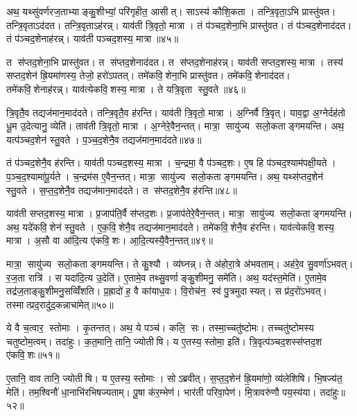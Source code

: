 अथ॒ यथ्सु॑वर्णरज॒ताभ्याङ्कु॒शीभ्यां॒ परि॑गृहीत॒ आसीत्। साऽस्य॑ कौशि॒कता। तन्त्रि॒वृता॒ऽभि प्रास्तु॑वत। तन्त्रि॒वृताऽद॑दत। तन्त्रि॒वृताऽह॑रन्न्। याव॑ती त्रि॒वृतो॒ मात्रा। तं प॑ञ्चद॒शेना॒भि प्रास्तु॑वत। तं प॑ञ्चद॒शेनाद॑दत। तं प॑ञ्चद॒शेनाह॑रन्न्। याव॑ती पञ्चद॒शस्य॒ मात्रा॥४५॥

त स॑प्तद॒शेना॒भि प्रास्तु॑वत। त स॑प्तद॒शेनाद॑दत। त स॑प्तद॒शेनाह॑रन्न्। याव॑ती सप्तद॒शस्य॒ मात्रा। तस्य॑ सप्तद॒शेन॑ ह्रि॒यमा॑णस्य॒ तेजो॒ हरो॑ऽपतत्। तमे॑कवि॒शेना॒भि प्रास्तु॑वत। तमे॑कवि॒शेनाद॑दत। तमे॑कवि॒शेनाह॑रन्न्। याव॑त्येकवि॒शस्य॒ मात्रा। ते यत्रि॒वृता स्तु॒वते॥४६॥

त्रि॒वृतै॒व तद्यज॑मान॒माद॑दते। तन्त्रि॒वृतै॒व ह॑रन्ति। याव॑ती त्रि॒वृतो॒ मात्रा। अ॒ग्निर्वै त्रि॒वृत्। याव॒द्वा अ॒ग्नेर्दह॑तो धू॒म उ॒देत्यानु॒ व्येति॑। ताव॑ती त्रि॒वृतो॒ मात्रा। अ॒ग्नेरे॒वैन॒न्तत्। मात्रा॒ सायु॑ज्य सलो॒कताङ्गमयन्ति। अथ॒ यत्प॑ञ्चद॒शेन॑ स्तु॒वते। प॒ञ्च॒द॒शेनै॒व तद्यज॑मान॒माद॑दते॥४७॥

तं प॑ञ्चद॒शेनै॒व ह॑रन्ति। याव॑ती पञ्चद॒शस्य॒ मात्रा। च॒न्द्रमा॒ वै प॑ञ्चद॒शः। ए॒ष हि प॑ञ्चद॒श्याम॑पक्षी॒यते। प॒ञ्च॒द॒श्यामा॑पू॒र्यते। च॒न्द्रम॑स ए॒वैन॒न्तत्। मात्रा॒ सायु॑ज्य सलो॒कताङ्गमयन्ति। अथ॒ यथ्स॑प्तद॒शेन॑ स्तु॒वते। स॒प्त॒द॒शेनै॒व तद्यज॑मान॒माद॑दते। त स॑प्तद॒शेनै॒व ह॑रन्ति॥४८॥

याव॑ती सप्तद॒शस्य॒ मात्रा। प्र॒जाप॑ति॒र्वै स॑प्तद॒शः। प्र॒जाप॑तेरे॒वैन॒न्तत्। मात्रा॒ सायु॑ज्य सलो॒कताङ्गमयन्ति। अथ॒ यदे॑कवि॒शेन॑ स्तु॒वते। ए॒क॒वि॒शेनै॒व तद्यज॑मान॒माद॑दते। तमे॑कवि॒शेनै॒व ह॑रन्ति। याव॑त्येकवि॒शस्य॒ मात्रा। अ॒सौ वा आ॑दि॒त्य ए॑कवि॒शः। आ॒दि॒त्यस्यै॒वैन॒न्तत्॥४९॥

मात्रा॒ सायु॑ज्य सलो॒कताङ्गमयन्ति। ते कु॒श्यौ। व्य॑घ्नन्न्। ते अ॑होरा॒त्रे अ॑भवताम्। अह॑रे॒व सु॒वर्णा॑ऽभवत्। र॒ज॒ता रात्रि॑। स यदा॑दि॒त्य उ॒देति॑। ए॒तामे॒व तथ्सु॒वर्णाङ्कु॒शीमनु॒ समे॑ति। अथ॒ यद॑स्त॒मेति॑। ए॒तामे॒व तद्र॑ज॒ताङ्कु॒शीमनु॒सव्विँ॑शति। प्र॒ह्रादो॑ ह॒ वै का॑याध॒वः। वि॒रोच॑न॒ स्वं पु॒त्रमुदास्यत्। स प्र॑द॒रो॑ऽभवत्। तस्मात्प्रद॒रादु॑द॒कन्नाचा॑मेत्॥५०॥\anuvakamend[आ॒दि॒त्यः प॑ञ्चद॒शस्य॒ मात्रा स्तु॒वते॑ पञ्चद॒शेनै॒व तद्यज॑मान॒माद॑दते सप्तद॒शेनै॒व ह॑रन्त्यादि॒त्यस्यै॒वैनं॒ तद्वि॑शति च॒त्वारि॑ च]

ये वै च॒त्वार॒ स्तोमाः। कृ॒तन्तत्। अथ॒ ये पञ्च॑। कलि॒ सः। तस्मा॒च्चतु॑ष्टोमः। तच्चतु॑ष्टोमस्य चतुष्टोम॒त्वम्। तदा॑हुः। क॒त॒मानि॒ तानि॒ ज्योतीषि। य ए॒तस्य॒ स्तोमा॒ इति॑। त्रि॒वृत्प॑ञ्चद॒शस्स॑प्तद॒श ए॑कवि॒शः॥५१॥

ए॒तानि॒ वाव तानि॒ ज्योतीषि। य ए॒तस्य॒ स्तोमाः। सोऽब्रवीत्। स॒प्त॒द॒शेन॑ ह्रि॒यमा॑णो॒ व्य॑लेशिषि। भि॒षज्य॑त॒ मेति॑। तम॒श्विनौ॑ धा॒नाभि॑रभिषज्यताम्। पू॒षा क॑र॒म्भेण॑। भार॑ती परिवा॒पेण॑। मि॒त्रावरु॑णौ पय॒स्य॑या। तदा॑हुः॥५२॥

